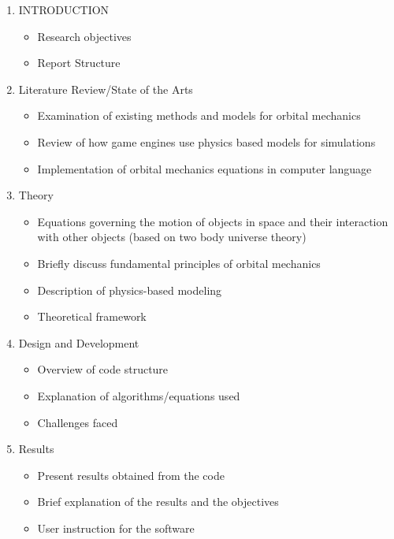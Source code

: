 \documentclass[18pt, letter]{article}
\begin{document}
\begin{enumerate}
    \item INTRODUCTION 
    \begin{itemize}
        \item Research objectives
        \item Report Structure
    \end{itemize}

    \item Literature Review/State of the Arts %
    \begin{itemize}
        \item Examination of existing methods and models for orbital mechanics
        \item Review of how game engines use physics based models for simulations
        \item Implementation of orbital mechanics equations in computer language
    \end{itemize}

    \item Theory
    \begin{itemize}
        \item Equations governing the motion of objects in space and their interaction with other objects (based on two body universe theory)
        \item Briefly discuss fundamental principles of orbital mechanics
        \item Description of physics-based modeling
        \item Theoretical framework
    \end{itemize}

    \item Design and Development
    \begin{itemize}
        \item Overview of code structure
        \item Explanation of algorithms/equations used
        \item Challenges faced
    \end{itemize}

    \item Results
    \begin{itemize}
        \item Present results obtained from the code
        \item Brief explanation of the results and the objectives 
        \item  User instruction for the software
    \end{itemize}


\end{enumerate}
\end{document}
